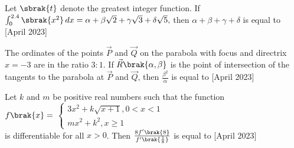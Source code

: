 \item Let $\sbrak{t}$ denote the greatest integer function. If $\int_{0}^{2.4} \sbrak{x^2} \, dx
=\alpha+\beta\sqrt{2}+\gamma\sqrt{3}+\delta\sqrt{5},$ then $\alpha+\beta+\gamma+\delta$ is equal to \hfill{[April 2023]}

\item The ordinates of the points $\vec{P}$ and $\vec{Q}$ on the parabola with focus  and directrix $x=-3$ are in the ratio $3:1$. If $\vec{R}\brak{\alpha,\beta}$ is the point of intersection of the tangents to the parabola at $\vec{P}$ and $\vec{Q}$, then $\frac{\beta^2}{\alpha}$ is equal to \hfill{[April 2023]}

\item Let $k$ and $m$ be positive real numbers such that the function \\$f\brak{x}=$
$\begin{cases}
    3x^2+k\sqrt{x+1}, 0<x<1\\
    mx^2+k^2, x\geq 1 
\end{cases} $ \\is differentiable for all $x>0$. Then $\frac{8f^{\prime}\brak{8}}{f^{\prime}\brak{\frac{1}{8}}}$ is equal to \hfill{[April 2023]}
%


